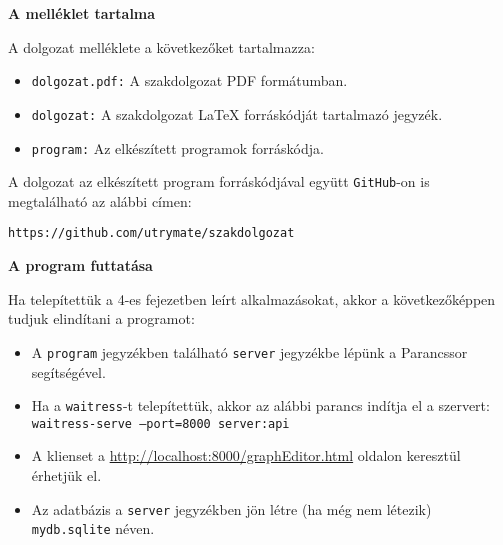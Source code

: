 \pagestyle{empty}

\noindent \textbf{\Large A melléklet tartalma}

\vskip 1cm

\noindent A dolgozat melléklete a következőket tartalmazza:
\begin{itemize}
\item \texttt{dolgozat.pdf:} A szakdolgozat PDF formátumban.
\item \texttt{dolgozat:} A szakdolgozat \LaTeX{} forráskódját tartalmazó jegyzék.
\item \texttt{program:} Az elkészített programok forráskódja.
\end{itemize}
A dolgozat az elkészített program forráskódjával együtt \texttt{GitHub}-on is megtalálható az alábbi címen:

\vskip 0.5cm

\texttt{https://github.com/utrymate/szakdolgozat}

\vskip 0.5cm

\noindent \textbf{\large A program futtatása}

\vskip 0.3cm

\noindent Ha telepítettük a 4-es fejezetben leírt alkalmazásokat, akkor a következőképpen tudjuk elindítani a programot:

\begin{itemize}
\item A \texttt{program} jegyzékben található \texttt{server} jegyzékbe lépünk a Parancssor segítségével.
\item Ha a \texttt{waitress}-t telepítettük, akkor az alábbi parancs indítja el a szervert: \texttt{waitress-serve --port=8000 server:api}
\item A klienset a \url{http://localhost:8000/graphEditor.html} oldalon keresztül érhetjük el.
\item Az adatbázis a \texttt{server} jegyzékben jön létre (ha még nem létezik) \texttt{mydb.sqlite} néven.
\end{itemize}
